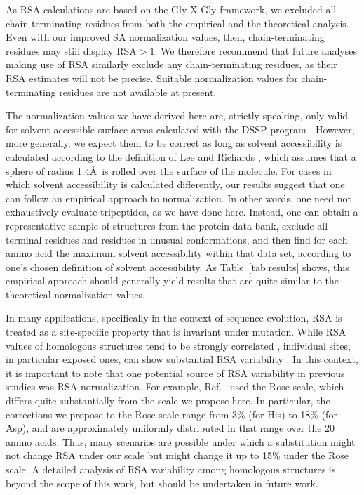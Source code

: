 \documentclass[11pt]{article}
\begin{document}
As RSA calculations are based on the Gly-X-Gly framework, we excluded all chain terminating residues from both the empirical and the theoretical analysis. Even with our improved SA normalization values, then, chain-terminating residues may still display $\text{RSA}>1$. We therefore recommend that future analyses making use of RSA similarly exclude any chain-terminating residues, as their RSA estimates will not be precise. Suitable normalization values for chain-terminating residues are not available at present. 

The normalization values we have derived here are, strictly speaking, only valid for solvent-accessible surface areas calculated with the DSSP program \cite{Kabsch1983}. However, more generally, we expect them to be correct as long as solvent accessibility is calculated according to the definition of Lee and Richards \cite{LeeRichards1971}, which assumes that a sphere of radius 1.4\AA\ is rolled over the surface of the molecule. For cases in which solvent accessibility is calculated differently, our results suggest that one can follow an empirical approach to normalization. In other words, one need not exhaustively evaluate tripeptides, as we have done here. Instead, one can obtain a representative sample of structures from the protein data bank, exclude all terminal residues and residues in unusual conformations, and then find for each amino acid the maximum solvent accessibility within that data set, according to one's chosen definition of solvent accessibility. As Table~\ref{tab:results} shows, this empirical approach should generally yield results that are quite similar to the theoretical normalization values.

In many applications, specifically in the context of sequence evolution, RSA is treated as a site-specific property that is invariant under mutation. While RSA values of homologous structures tend to be strongly correlated \cite{RostSander1994,Zhouetal2009}, individual sites, in particular exposed ones, can show substantial RSA variability \cite{RostSander1994}. In this context, it is important to note that one potential source of RSA variability in previous studies was RSA normalization. For example, Ref.~\cite{RostSander1994} used the Rose scale, which differs quite substantially from the scale we propose here. In particular, the corrections we propose to the Rose scale range from 3\% (for His) to 18\% (for Asp), and are approximately uniformly distributed in that range over the 20 amino acids. Thus, many scenarios are possible under which a substitution might not change RSA under our scale but might change it up to 15\% under the Rose scale. A detailed analysis of RSA variability among homologous structures is beyond the scope of this work, but should be undertaken in future work.
\end{document}
